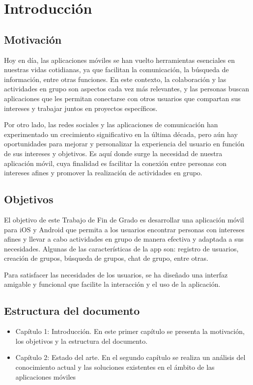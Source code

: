 \chapter{Introducción}
\section{Motivación}
Hoy en día, las aplicaciones móviles se han vuelto herramientas 
esenciales en nuestras vidas cotidianas, ya que facilitan la 
comunicación, la búsqueda de información, entre otras funciones. 
En este contexto, la colaboración y las actividades en grupo son 
aspectos cada vez más relevantes, y las personas buscan aplicaciones 
que les permitan conectarse con otros usuarios que compartan sus 
intereses y trabajar juntos en proyectos específicos.

Por otro lado, las redes sociales y las aplicaciones de comunicación 
han experimentado un crecimiento significativo en la última década, 
pero aún hay oportunidades para mejorar y personalizar la experiencia 
del usuario en función de sus intereses y objetivos. Es aquí donde 
surge la necesidad de nuestra aplicación móvil, cuya finalidad es 
facilitar la conexión entre personas con intereses afines y promover 
la realización de actividades en grupo.

\section{Objetivos}
El objetivo de este Trabajo de Fin de Grado es desarrollar una 
aplicación móvil para iOS y Android que permita a los usuarios 
encontrar personas con intereses afines y llevar a cabo actividades 
en grupo de manera efectiva y adaptada a sus necesidades. Algunas 
de las características de la app son: registro de usuarios, creación 
de grupos, búsqueda de grupos, chat de grupo, entre otras.

Para satisfacer las necesidades de los usuarios, se ha diseñado una 
interfaz amigable y funcional que facilite la interacción y el uso de 
la aplicación.

\section{Estructura del documento}
\begin{itemize}
\item Capítulo 1: Introducción. En este primer capítulo se presenta la 
motivación, los objetivos y la estructura del documento.
\item Capítulo 2: Estado del arte. En el segundo capítulo se realiza 
un análisis del conocimiento actual y las soluciones existentes en el ámbito de las aplicaciones móviles 

\end{itemize}